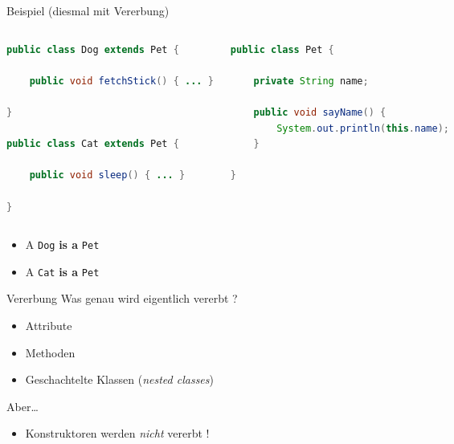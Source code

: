 \documentclass[18pt]{beamer}
\begin{document}
\begin{frame}[fragile]{Beispiel (diesmal mit Vererbung)}
    \begin{columns}[c]
            \begin{exampleblock}{}
                \begin{lstlisting}[language=Java,basicstyle=\scriptsize]
public class Dog extends Pet {

    public void fetchStick() { ... }

}

public class Cat extends Pet {

    public void sleep() { ... }

}
                \end{lstlisting}
            \end{exampleblock}
            \begin{exampleblock}{}
                \begin{lstlisting}[language=Java,basicstyle=\scriptsize]
public class Pet {

    private String name;

    public void sayName() {
        System.out.println(this.name);
    }

}
                \end{lstlisting}
            \end{exampleblock}
    \end{columns}

    \begin{itemize}
        \item A \texttt{Dog} \textbf{is a} \texttt{Pet}
        \item A \texttt{Cat} \textbf{is a} \texttt{Pet}
    \end{itemize}
\end{frame}

\begin{frame}{Vererbung}
    Was genau wird eigentlich vererbt ?
    \vspace{.2in}
    \begin{itemize}
        \item Attribute
        \item Methoden
        \item Geschachtelte Klassen (\textit{nested classes})
    \end{itemize}
    \vspace{.2in}
    Aber\dots
    \begin{itemize}
        \item \alert{Konstruktoren werden \textit{nicht} vererbt !}
    \end{itemize}
\end{frame}
\end{document}
